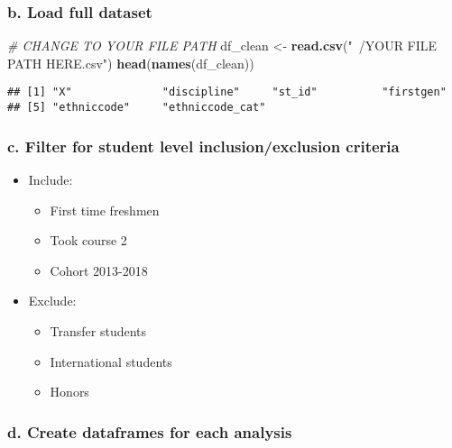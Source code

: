 \documentclass[]{article}
\newenvironment{Shaded}{\begin{snugshade}}{\end{snugshade}}
\newcommand{\KeywordTok}[1]{\textcolor[rgb]{0.13,0.29,0.53}{\textbf{#1}}}
\newcommand{\StringTok}[1]{\textcolor[rgb]{0.31,0.60,0.02}{#1}}
\newcommand{\CommentTok}[1]{\textcolor[rgb]{0.56,0.35,0.01}{\textit{#1}}}
\newcommand{\NormalTok}[1]{#1}
\providecommand{\tightlist}{%
  \setlength{\itemsep}{0pt}\setlength{\parskip}{0pt}}
\begin{document}
\subsubsection{b. Load full dataset}\label{b.-load-full-dataset-1}

\begin{Shaded}
\begin{Highlighting}[]
\CommentTok{# CHANGE TO YOUR FILE PATH}
\NormalTok{df_clean <-}\StringTok{ }\KeywordTok{read.csv}\NormalTok{(}\StringTok{"~/YOUR FILE PATH HERE.csv"}\NormalTok{)}
\KeywordTok{head}\NormalTok{(}\KeywordTok{names}\NormalTok{(df_clean))}
\end{Highlighting}
\end{Shaded}

\begin{verbatim}
## [1] "X"              "discipline"     "st_id"          "firstgen"      
## [5] "ethniccode"     "ethniccode_cat"
\end{verbatim}

\subsubsection{c. Filter for student level inclusion/exclusion
criteria}\label{c.-filter-for-student-level-inclusionexclusion-criteria}

\begin{itemize}
\tightlist
\item
  Include:

  \begin{itemize}
  \tightlist
  \item
    First time freshmen
  \item
    Took course 2
  \item
    Cohort 2013-2018
  \end{itemize}
\item
  Exclude:

  \begin{itemize}
  \tightlist
  \item
    Transfer students
  \item
    International students
  \item
    Honors
  \end{itemize}
\end{itemize}

\subsubsection{d. Create dataframes for each
analysis}\label{d.-create-dataframes-for-each-analysis}
\end{document}
